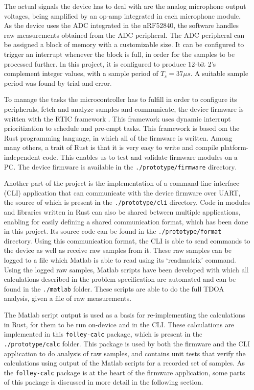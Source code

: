 \documentclass[a4paper]{article}
\newcommand{\rust}[1]{\texttt{#1}}
\begin{document}
The actual signals the device has to deal with are the analog microphone output voltages, being amplified by an op-amp integrated in each microphone module. As the device uses the ADC integrated in the nRF52840, the software handles raw measurements obtained from the ADC peripheral. The ADC peripheral can be assigned a block of memory with a customizable size. It can be configured to trigger an interrupt whenever the block is full, in order for the samples to be processed further. In this project, it is configured to produce 12-bit 2's complement integer values, with a sample period of $T_s = 37 \mu s$. A suitable sample period was found by trial and error.

To manage the tasks the microcontroller has to fulfill in order to configure its peripherals, fetch and analyze samples and communicate, the device firmware is written with the RTIC framework \cite{rtic}. This framework uses dynamic interrupt prioritization to schedule and pre-empt tasks. This framework is based om the Rust programming language, in which all of the firmware is written. Among many others, a trait of Rust is that it is very easy to write and compile platform-independent code. This enables us to test and validate firmware modules on a PC. The device firmware is available in the \texttt{./prototype/firmware} directory.

Another part of the project is the implementation of a command-line interface (CLI) application that can communicate with the device firmware over UART, the source of which is present in the \texttt{./prototype/cli} directory. Code in modules and libraries written in Rust can also be shared between multiple applications, enabling for easily defining a shared communication format, which has been done in this project. Its source code can be found in the \newline\texttt{./prototype/format} directory. Using this communication format, the CLI is able to send commands to the device as well as receive raw samples from it. These raw samples can be logged to a file which Matlab is able to read using its `readmatrix' command. Using the logged raw samples, Matlab scripts have been developed with which all calculations described in the problem specification are automated and can be found in the \texttt{./matlab} folder. These scripts are able to do the full TDOA analysis, given a file of raw measurements.

The Matlab script output is used as a basis for re-implementing the calculations in Rust, for them to be run on-device and in the CLI. These calculations are implemented in this \rust{folley-calc} package, which is present in the \texttt{./prototype/calc} folder. This package is used by both the firmware and the CLI application to do analysis of raw samples, and contains unit tests that verify the calculations using output of the Matlab scripts for a recorded set of samples. As the \rust{folley-calc} package is at the heart of the firmware application, some parts of this package is discussed in more detail in the following section.
\end{document}
